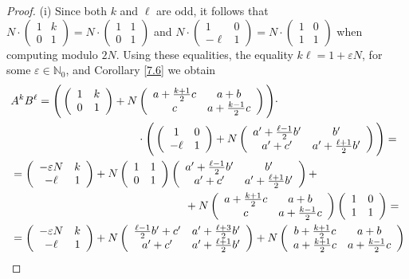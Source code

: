 \documentclass[10pt]{amsart}
\theoremstyle{plain}
\theoremstyle{definition}
\theoremstyle{remark}%
\newcommand{\N}{\mathbb{N}}
\newcommand{\mat}[4]{\left(\begin{array}{cc}
 #1 & #2\\
 #3 & #4\\
\end{array}\right)}
\begin{document}
\begin{proof}
(i) Since both $k$ and $\ell$ are odd, it follows that $N\cdot(\begin{smallmatrix}1 & k\\ 0 & 1\end{smallmatrix})=N\cdot(\begin{smallmatrix}1 & 1\\ 0 & 1\end{smallmatrix})$ and $N\cdot(\begin{smallmatrix}1 & 0\\ -\ell & 1\end{smallmatrix})=N\cdot(\begin{smallmatrix}1 & 0\\ 1 & 1\end{smallmatrix})$ when computing modulo $2N$. Using these equalities, the equality $k\ell=1+\varepsilon N$, for some $\varepsilon\in\N_{0}$, and Corollary \ref{7.6} we obtain
\begin{align*}
 &A^k B^{\ell}=\Bigg(\mat{1}{k}{0}{1}+N\mat{a+\frac{k+1}{2}c}{a+b}{c}{a+\frac{k-1}{2}c}\Bigg)\cdot\\
 &\hspace{40mm}\cdot\Bigg(\mat{1}{0}{-\ell}{1}+N\mat{a'+\frac{\ell-1}{2}b'}{b'}{a'+c'}{a'+\frac{\ell+1}{2}b'}\Bigg)=\\
 &=\mat{-\varepsilon N}{k}{-\ell}{1}+N\mat{1}{1}{0}{1}\mat{a'+\frac{\ell-1}{2}b'}{b'}{a'+c'}{a'+\frac{\ell+1}{2}b'}+\\
&\hspace{55mm}+ N\mat{a+\frac{k+1}{2}c}{a+b}{c}{a+\frac{k-1}{2}c}\mat{1}{0}{1}{1}=\\
 &=\mat{-\varepsilon N}{k}{-\ell}{1}+N\mat{\frac{\ell-1}{2}b'+c'}{a'+\frac{\ell+3}{2}b'}{a'+c'}{a'+\frac{\ell+1}{2}b'}+
 N\mat{b+\frac{k+1}{2}c}{a+b}{a+\frac{k+1}{2}c}{a+\frac{k-1}{2}c}
 \end{align*}
 

\end{proof}
\end{document}

